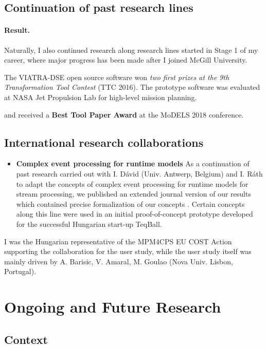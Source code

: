 \subsection{Continuation of past research lines}
\paragraph{Result.} 
Naturally, I also continued research along research lines started in Stage 1 of my career, where major progress has been made after I joined McGill University. 


The VIATRA-DSE open source software won \emph{two first prizes at the 9th Transformation Tool Contest} (TTC 2016). The prototype software was evaluated at NASA Jet Propulsion Lab for high-level mission planning.

and \cite{models2018-tool} received a \textbf{Best Tool Paper Award} at the MoDELS 2018 conference. 


\subsection{International research collaborations}

\begin{itemize}
\item \textbf{Complex event processing for runtime models}
As a continuation of past research \cite{models2014-stream} carried out with I. Dávid (Univ. Antwerp, Belgium) and I. Ráth to adapt the concepts of complex event processing for runtime models for stream processing, we published an extended journal version of our results which contained precise formalization of our concepts \cite{sosym2018-cep}. Certain concepts along this line were used in an initial proof-of-concept prototype developed for the successful Hungarian start-up TeqBall.

\end{itemize}

I was the Hungarian representative of the MPM4CPS EU COST Action supporting the collaboration for the user study, while the user study itself was mainly driven by A. Barisic, V. Amaral, M. Goulao (Nova Univ. Lisbon, Portugal).

\section{Ongoing and Future Research}

\subsection{Context}

